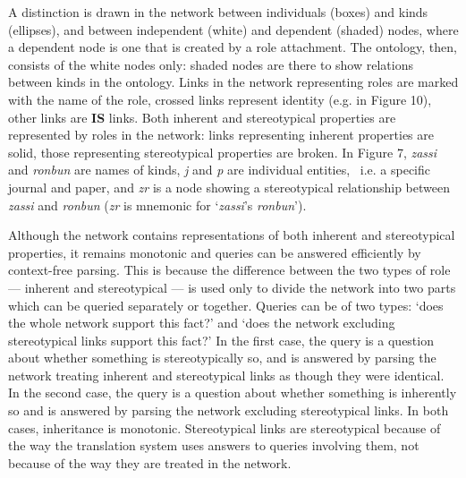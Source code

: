 A distinction is drawn in the network between individuals (boxes) and
kinds (ellipses), and between independent (white) and dependent (shaded)
nodes, where a dependent node is one that is created by a role
attachment.
The ontology, then, consists of the white nodes only: shaded nodes are there
to show relations between kinds in the ontology.
Links in the network representing roles are marked with the name of the
role, crossed links represent identity (e.g. in Figure 10),
other links are {\bf\small IS\/} links.
Both inherent and stereotypical properties are represented by roles in
the network:
links representing inherent properties are solid, those representing
stereotypical properties are broken.
In Figure 7, {\it zassi\/} and {\it ronbun\/} are names of kinds,
{\it j\/} and {\it p\/} are individual entities,~
i.e. a specific journal and paper, and
{\it zr\/}
is a node showing a stereotypical relationship between
{\it zassi\/}
and
{\it ronbun\/}
({\it zr\/} is mnemonic for `{\it zassi\/}'s {\it ronbun\/}').

Although the network contains representations of both inherent and
stereotypical
properties, it remains monotonic and queries can be answered efficiently by
context-free parsing.
This is because the difference between the two types of role ---
inherent and stereotypical --- is used only to divide the network into
two parts which can be queried separately or together.
Queries can be of two types: `does the whole network support this fact?'
and `does the network excluding stereotypical links support this fact?'
In the first case, the query is a question about whether something is
stereotypically so,
and is answered by parsing the network treating inherent and
stereotypical links as though they were identical. In the second case,
the query is a question about whether something is inherently so and is
answered by parsing the network excluding stereotypical links. In both
cases, inheritance is monotonic.
Stereotypical links are stereotypical because of the way the translation
system uses answers to queries involving them, not because of the way
they are treated in the network.

